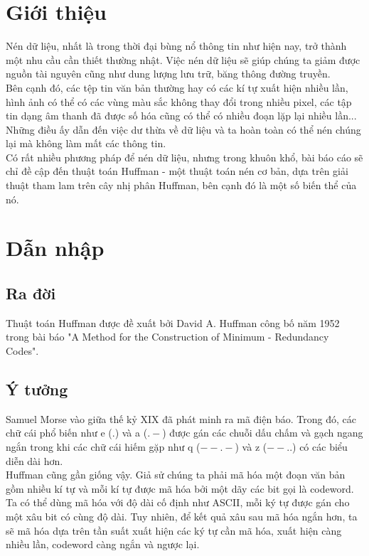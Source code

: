 \chapter*{Giới thiệu}
Nén dữ liệu, nhất là trong thời đại bùng nổ thông tin như hiện nay, trở thành một nhu cầu cần thiết thường nhật. Việc nén dữ liệu sẽ giúp chúng ta giảm được nguồn tài nguyên cũng như dung lượng lưu trữ, băng thông đường truyền.\\
\indent{}Bên cạnh đó, các tệp tin văn bản thường hay có các kí tự xuất hiện nhiều lần, hình ảnh có thể có các vùng màu sắc không thay đổi trong nhiều pixel, các tập tin dạng âm thanh đã được số hóa cũng có thể có nhiều đoạn lặp lại nhiều lần... Những điều ấy dẫn đến việc dư thừa về dữ liệu và ta hoàn toàn có thể nén chúng lại mà không làm mất các thông tin.\\
\indent{}Có rất nhiều phương pháp để nén dữ liệu, nhưng trong khuôn khổ, bài báo cáo sẽ chỉ đề cập đến thuật toán Huffman - một thuật toán nén cơ bản, dựa trên giải thuật tham lam trên cây nhị phân Huffman, bên cạnh đó là một số biến thể của nó. 

\pagebreak

\chapter{Dẫn nhập}

\section{Ra đời}
Thuật toán Huffman được đề xuất bởi David A. Huffman công bố năm 1952 trong bài báo "A Method for the Construction of Minimum - Redundancy Codes".
\section{Ý tưởng}
Samuel Morse vào giữa thế kỷ XIX đã phát minh ra mã điện báo. Trong đó, các chữ cái phổ biến như e ($.$) và a ($. -$) được gán các chuỗi dấu chấm và gạch ngang ngắn trong khi các chữ cái hiếm gặp như q ($- - . -$) và z ($- - . .$) có các biểu diễn dài hơn.\\
\indent{} Huffman cũng gần giống vậy. Giả sử chúng ta phải mã hóa một đoạn văn bản gồm nhiều kí tự và mỗi kí tự được mã hóa bởi một dãy các bit gọi là codeword. Ta có thể dùng mã hóa với độ dài cố định như ASCII, mỗi ký tự được gán cho một xâu bit có cùng độ dài. Tuy nhiên, để kết quả xâu sau mã hóa ngắn hơn, ta sẽ mã hóa dựa trên tần suất xuất hiện các ký tự cần mã hóa, xuất hiện càng nhiều lần, codeword càng ngắn và ngược lại.

